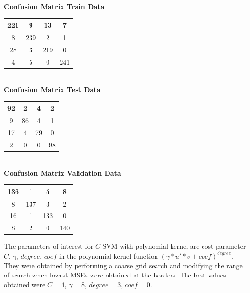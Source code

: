 \documentclass{article}
\begin{document}
\begin{flushleft}
\textbf{Confusion Matrix Train Data\\[5pt]}
\begin{tabular}{|c|c|c|c|}
\hline
221 & 9 & 13 & 7 \\
\hline
8 & 239 & 2 & 1 \\
\hline
28 & 3 & 219 & 0 \\
\hline
4 & 5 & 0 & 241 \\
\hline
\end{tabular}
\textbf{\\[10pt] Confusion Matrix Test Data \\[5pt]}
\begin{tabular}{|c|c|c|c|}
\hline
92 & 2 & 4 & 2 \\
\hline
9 & 86 & 4 & 1 \\
\hline
17 & 4 & 79 & 0 \\
\hline
2 & 0 & 0 & 98 \\
\hline
\end{tabular}
\textbf{\\[10pt] Confusion Matrix Validation Data \\[5pt]}
\begin{tabular}{|c|c|c|c|}
\hline
136 & 1 & 5 & 8 \\
\hline
8 & 137 & 3 & 2 \\
\hline
16 & 1 & 133 & 0 \\
\hline
8 & 2 & 0 & 140 \\
\hline
\end{tabular}
\end{flushleft}


The parameters of interest for $C$-SVM with polynomial kernel are cost parameter $C$, $\gamma$, $degree$, $coef$ in the polynomial kernel function $(\gamma*u'*v+coef)^{degree}$. They were obtained by performing a coarse grid search and modifying the range of search when lowest MSEs were obtained at the borders.
The best values obtained were $C=4$, $\gamma=8$, $degree=3$, $coef=0$.

\newpage
\end{document}
